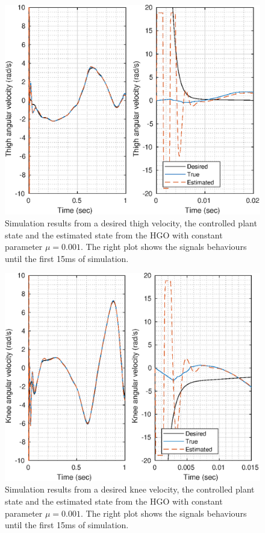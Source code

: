 \documentclass[letterpaper, 10 pt, journal, twocolumn]{IEEEtran}  %
\theoremstyle{plain}
\theoremstyle{definition}
\theoremstyle{remark}
\begin{document}
%
%
\begin{figure}[h!]
	\begin{center}
	\includegraphics[width = 13cm]{Figs/dq_thigh_mu_1e-03.eps}
	\caption{Simulation results from a desired thigh velocity, the controlled plant state and the estimated state from the HGO with constant parameter $\mu=0.001$. The right plot shows the signals behaviours until the first 15ms of simulation.}
	\label{fig:dthigh}
	\end{center}
\end{figure}
%
%
\begin{figure}[h!]
	\begin{center}
	\includegraphics[width = 13cm]{Figs/dq_knee_mu_1e-03.eps}
	\caption{Simulation results from a desired knee velocity, the controlled plant state and the estimated state from the HGO with constant parameter $\mu=0.001$. The right plot shows the signals behaviours until the first 15ms of simulation.}
	\label{fig:dknee}
	\end{center}
\end{figure}
\end{document}
